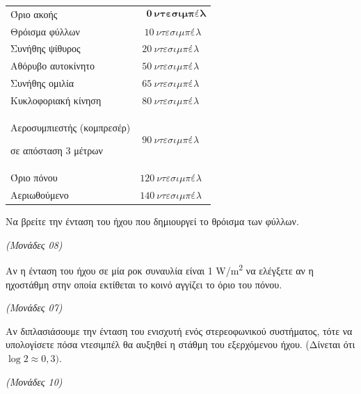 \documentclass[11pt,a4paper,twoside]{book}
\newcommand{\monades}[1]{\hfill \textit{(Μονάδες #1)}}
\begin{document}
\begin{longtable}[]{@{}
  >{\raggedright\arraybackslash}p{}
  >{\raggedright\arraybackslash}p{}@{}}
\noalign{}
\begin{minipage}[b]{\linewidth}\raggedright
Όριο ακοής
\end{minipage} & \begin{minipage}[b]{\linewidth}\raggedright
\begin{equation*}\mathbf{\ \ \ 0\ \nu\tau\varepsilon\sigma\iota\mu\pi έ\lambda}\end{equation*}
\end{minipage} \\
\noalign{}

\noalign{}
\endlastfoot
Θρόισμα φύλλων & $\ \ 10\ \nu\tau\varepsilon\sigma\iota\mu\pi έ\lambda$ \\
Συνήθης ψίθυρος & $\ 20\ \nu\tau\varepsilon\sigma\iota\mu\pi έ\lambda$ \\
Αθόρυβο αυτοκίνητο & $\ 50\ \nu\tau\varepsilon\sigma\iota\mu\pi έ\lambda$ \\
Συνήθης ομιλία & $\ 65\ \nu\tau\varepsilon\sigma\iota\mu\pi έ\lambda$ \\
Κυκλοφοριακή κίνηση & $\ 80\ \nu\tau\varepsilon\sigma\iota\mu\pi έ\lambda$ \\
Αεροσυμπιεστής (κομπρεσέρ)

σε απόσταση 3 μέτρων & $\ 90\ \nu\tau\varepsilon\sigma\iota\mu\pi έ\lambda$ \\
Όριο πόνου & $120\ \nu\tau\varepsilon\sigma\iota\mu\pi έ\lambda$ \\
Αεριωθούμενο & $140\ \nu\tau\varepsilon\sigma\iota\mu\pi έ\lambda$ \\
\end{longtable}

\begin{alist}
\item Να βρείτε την ένταση του ήχου που δημιουργεί το θρόισμα των φύλλων.

\monades{08}

\item Αν η ένταση του ήχου σε μία ροκ συναυλία είναι 1 W/m\textsuperscript{2} να ελέγξετε αν η ηχοστάθμη στην οποία εκτίθεται το κοινό αγγίζει το όριο του πόνου.

\monades{07}

\item Αν διπλασιάσουμε την ένταση του ενισχυτή ενός στερεοφωνικού συστήματος, τότε να υπολογίσετε πόσα ντεσιμπέλ θα αυξηθεί η στάθμη του εξερχόμενου ήχου. (Δίνεται ότι $\log 2 \approx 0,3)$.

\monades{10}
\end{alist}
\end{document}
